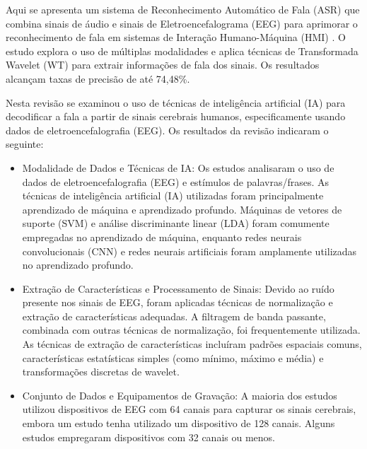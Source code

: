 \documentclass[a4paper,12pt,openright,oneside]{book}
\newenvironment{myenv}[1]
  {\begin{spacing}{#1}}
  {\end{spacing}}
\begin{document}
\begin{myenv}{1.5}
				\par Aqui se apresenta um sistema de Reconhecimento Automático de Fala (ASR) que combina sinais de áudio e sinais de Eletroencefalograma (EEG) para aprimorar o reconhecimento de fala em sistemas de Interação Humano-Máquina (HMI) \cite{WOS:000591530700001}. O estudo explora o uso de múltiplas modalidades e aplica técnicas de Transformada Wavelet (WT) para extrair informações de fala dos sinais.	Os resultados alcançam taxas de precisão de até 74,48\%.\newline
	
				\par Nesta revisão \cite{WOS:000857544900001} se examinou o uso de técnicas de inteligência artificial (IA) para decodificar a fala a partir de sinais cerebrais humanos, especificamente usando dados de eletroencefalografia (EEG). Os resultados da revisão indicaram o seguinte:
				
				\begin{itemize}
					\item Modalidade de Dados e Técnicas de IA: Os estudos analisaram o uso de dados de eletroencefalografia (EEG) e estímulos de palavras/frases. As técnicas de inteligência artificial (IA) utilizadas foram principalmente aprendizado de máquina e aprendizado profundo. Máquinas de vetores de suporte (SVM) e análise discriminante linear (LDA) foram comumente empregadas no aprendizado de máquina, enquanto redes neurais convolucionais (CNN) e redes neurais artificiais foram amplamente utilizadas no aprendizado profundo.
					
					\item Extração de Características e Processamento de Sinais: Devido ao ruído presente nos sinais de EEG, foram aplicadas técnicas de normalização e extração de características adequadas. A filtragem de banda passante, combinada com outras técnicas de normalização, foi frequentemente utilizada. As técnicas de extração de características incluíram padrões espaciais comuns, características estatísticas simples (como mínimo, máximo e média) e transformações discretas de wavelet.
					
					\item Conjunto de Dados e Equipamentos de Gravação: A maioria dos estudos utilizou dispositivos de EEG com 64 canais para capturar os sinais cerebrais, embora um estudo tenha utilizado um dispositivo de 128 canais. Alguns estudos empregaram dispositivos com 32 canais ou menos.
				\end{itemize}
	

\end{myenv}
\end{document}
